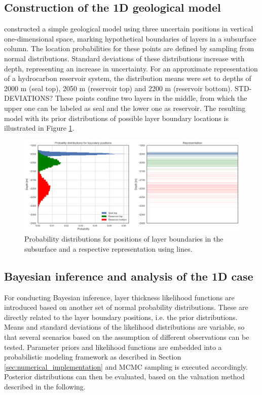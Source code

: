 			\subsection{Construction of the 1D geological model}\label{sec:1D_construction}	
			\citet{delaVarga2016} constructed a simple geological model using three uncertain positions in vertical one-dimensional space, marking hypothetical boundaries of layers in a subsurface column. The location probabilities for these points are defined by sampling from normal distributions. Standard deviations of these distributions increase with depth, representing an increase in uncertainty. For an approximate representation of a hydrocarbon reservoir system, the distribution means were set to depths of 2000 m (seal top), 2050 m (reservoir top) and 2200 m (reservoir bottom). STD-DEVIATIONS? These points confine two layers in the middle, from which the upper one can be labeled as seal and the lower one as reservoir. The resulting model with its prior distributions of possible layer boundary locations is illustrated in Figure \ref{fig:1D_model}.
		
			\begin{figure}[h]
				\centering
				\includegraphics[width=1\textwidth]{Figures/1D_model.png}
				\caption{Probability distributions for positions of layer boundaries in the subsurface and a respective representation using lines.}\label{fig:1D_model}
			\end{figure}
			
			\subsection{Bayesian inference and analysis of the 1D case}\label{sec:1D_bayes}
			For conducting Bayesian inference, layer thickness likelihood functions are introduced based on another set of normal probability distributions. These are directly related to the layer boundary positions, i.e. the prior distributions. Means and standard deviations of the likelihood distributions are variable, so that several scenarios based on the assumption of different observations can be tested. Parameter priors and likelihood functions are embedded into a probabilistic modeling framework as described in Section \ref{sec:numerical_implementation} and MCMC sampling is executed accordingly. Posterior distributions can then be evaluated, based on the valuation method described in the following.
			
